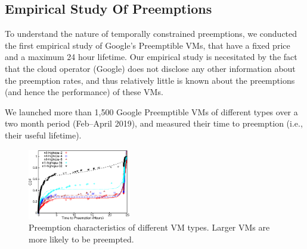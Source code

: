 



\vspace*{\subsecspace}
\subsection{Empirical Study Of Preemptions}


To understand the nature of temporally constrained preemptions, we conducted the first empirical study of Google's Preemptible VMs, that have a fixed price and a maximum 24 hour lifetime.
Our empirical study is necesitated by the fact that the cloud operator (Google) does not disclose any other information about the preemption rates, and thus relatively little is known about the preemptions (and hence the performance) of these VMs.


We launched more than 1,500 Google Preemptible VMs of different types over a two month period (Feb--April 2019), and measured their time to preemption (i.e., their useful lifetime).\footnotemark



\begin{figure}
  \centering 
  \includegraphics[width=0.4\textwidth]{../graphs/scispot-fig-vm-types.eps}
  \caption{Preemption characteristics of different VM types. Larger VMs are more likely to be preempted.}
  \label{fig:cdf-comparison}
    \vspace*{\myfigspace}
\end{figure}

